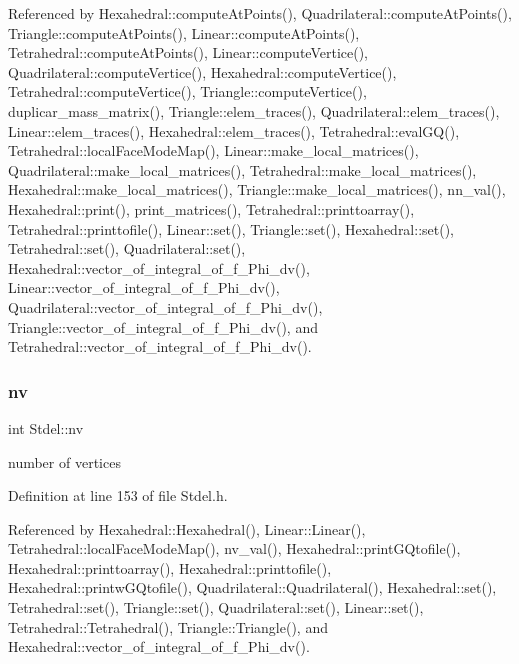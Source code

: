 Referenced by Hexahedral\+::compute\+At\+Points(), Quadrilateral\+::compute\+At\+Points(), Triangle\+::compute\+At\+Points(), Linear\+::compute\+At\+Points(), Tetrahedral\+::compute\+At\+Points(), Linear\+::compute\+Vertice(), Quadrilateral\+::compute\+Vertice(), Hexahedral\+::compute\+Vertice(), Tetrahedral\+::compute\+Vertice(), Triangle\+::compute\+Vertice(), duplicar\+\_\+mass\+\_\+matrix(), Triangle\+::elem\+\_\+traces(), Quadrilateral\+::elem\+\_\+traces(), Linear\+::elem\+\_\+traces(), Hexahedral\+::elem\+\_\+traces(), Tetrahedral\+::eval\+G\+Q(), Tetrahedral\+::local\+Face\+Mode\+Map(), Linear\+::make\+\_\+local\+\_\+matrices(), Quadrilateral\+::make\+\_\+local\+\_\+matrices(), Tetrahedral\+::make\+\_\+local\+\_\+matrices(), Hexahedral\+::make\+\_\+local\+\_\+matrices(), Triangle\+::make\+\_\+local\+\_\+matrices(), nn\+\_\+val(), Hexahedral\+::print(), print\+\_\+matrices(), Tetrahedral\+::printtoarray(), Tetrahedral\+::printtofile(), Linear\+::set(), Triangle\+::set(), Hexahedral\+::set(), Tetrahedral\+::set(), Quadrilateral\+::set(), Hexahedral\+::vector\+\_\+of\+\_\+integral\+\_\+of\+\_\+f\+\_\+\+Phi\+\_\+dv(), Linear\+::vector\+\_\+of\+\_\+integral\+\_\+of\+\_\+f\+\_\+\+Phi\+\_\+dv(), Quadrilateral\+::vector\+\_\+of\+\_\+integral\+\_\+of\+\_\+f\+\_\+\+Phi\+\_\+dv(), Triangle\+::vector\+\_\+of\+\_\+integral\+\_\+of\+\_\+f\+\_\+\+Phi\+\_\+dv(), and Tetrahedral\+::vector\+\_\+of\+\_\+integral\+\_\+of\+\_\+f\+\_\+\+Phi\+\_\+dv().

\mbox{\label{classStdel_a20c0e35541cab4a1f07974659ae7a9ad}} 
\subsubsection{\texorpdfstring{nv}{nv}}
{\footnotesize\ttfamily int Stdel\+::nv\hspace{0.3cm}{\ttfamily [protected]}}



number of vertices 



Definition at line 153 of file Stdel.\+h.



Referenced by Hexahedral\+::\+Hexahedral(), Linear\+::\+Linear(), Tetrahedral\+::local\+Face\+Mode\+Map(), nv\+\_\+val(), Hexahedral\+::print\+G\+Qtofile(), Hexahedral\+::printtoarray(), Hexahedral\+::printtofile(), Hexahedral\+::printw\+G\+Qtofile(), Quadrilateral\+::\+Quadrilateral(), Hexahedral\+::set(), Tetrahedral\+::set(), Triangle\+::set(), Quadrilateral\+::set(), Linear\+::set(), Tetrahedral\+::\+Tetrahedral(), Triangle\+::\+Triangle(), and Hexahedral\+::vector\+\_\+of\+\_\+integral\+\_\+of\+\_\+f\+\_\+\+Phi\+\_\+dv().

